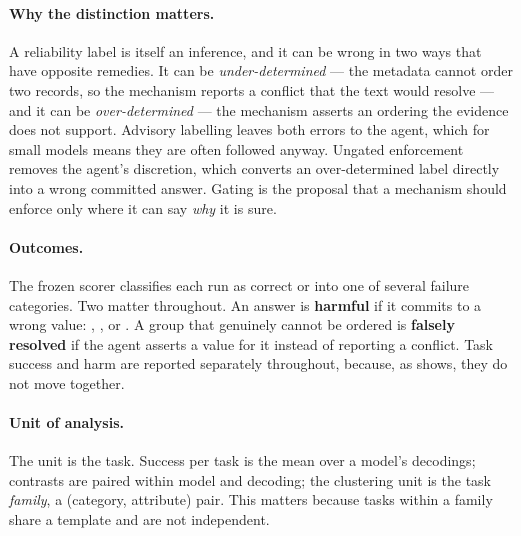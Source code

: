 \paragraph{Why the distinction matters.} A reliability label is itself an inference, and it can be wrong in two
ways that have opposite remedies. It can be \emph{under-determined} --- the metadata cannot order two records, so
the mechanism reports a conflict that the text would resolve --- and it can be \emph{over-determined} --- the
mechanism asserts an ordering the evidence does not support. Advisory labelling leaves both errors to the agent,
which for small models means they are often followed anyway. Ungated enforcement removes the agent's discretion,
which converts an over-determined label directly into a wrong committed answer. Gating is the proposal that a
mechanism should enforce only where it can say \emph{why} it is sure.

\paragraph{Outcomes.} The frozen scorer classifies each run as correct or into one of several failure categories.
Two matter throughout. An answer is \textbf{harmful} if it commits to a wrong value: ,
,  or . A group that genuinely cannot be ordered
is \textbf{falsely resolved} if the agent asserts a value for it instead of reporting a conflict. Task success and
harm are reported separately throughout, because, as  shows, they do not move together.

\paragraph{Unit of analysis.} The unit is the task. Success per task is the mean over a model's decodings; contrasts
are paired within model and decoding; the clustering unit is the task \emph{family}, a (category, attribute) pair.
This matters because tasks within a family share a template and are not independent.
